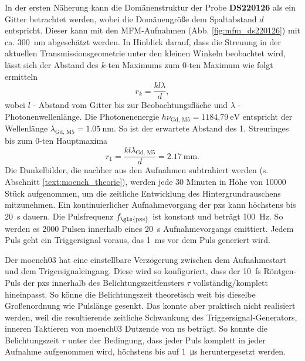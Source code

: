 \noindent
In der ersten Näherung kann die Domänenstruktur der Probe \textbf{DS220126} als ein Gitter betrachtet werden, wobei die Domänengröße dem Spaltabstand $d$ entspricht. Dieser kann mit den MFM-Aufnahmen (Abb. \ref{fig:mfm_ds220126}) mit ca. \SI{300}{\nano\meter} abgeschätzt werden. In Hinblick darauf, dass die Streuung in der aktuellen Transmissionsgeometrie unter den kleinen Winkeln beobachtet wird, lässt sich der Abstand des $k$-ten Maximums zum $0$-ten Maximum wie folgt ermitteln
\begin{equation}
     r_{k} = \frac{kl\lambda}{d},
 \end{equation}
 wobei $l$ - Abstand vom Gitter bis zur Beobachtungsfläche und $\lambda$ - Photonenwellenlänge. Die Photonenenergie $h\nu_{\text{Gd, M5}} = \SI{1184,79}{\eV}$ entspricht der Wellenlänge $\lambda_{\text{Gd, M5}} = \SI{1,05}{\nano\meter}$. So ist der erwartete Abstand des 1. Streuringes bis zum $0$-ten Hauptmaxima 
 \begin{equation}
     r_{1} = \frac{kl\lambda_{\text{Gd, M5}}}{d} = \SI{2.17}{\milli\meter}.
\end{equation}
\noindent
Die Dunkelbilder, die nachher aus den Aufnahmen subtrahiert werden (s. Abschnitt \ref{text:moench_theorie}), werden jede 30 Minuten in Höhe von \num{10000} Stück aufgenommen, um die zeitliche Entwicklung des Hintergrundrauschens mitzunehmen. Ein kontinuierlicher Aufnahmevorgang der \gls{pxs} kann höchstens bis \SI{20}{\second} dauern. Die Pulsfrequenz $f_\text{\gls{pxs}}$ ist konstant und beträgt \SI{100}{\hertz}. So werden es \num{2000} Pulsen innerhalb eines \SI{20}{\second} Aufnahmevorgangs emittiert. Jedem Puls geht ein Triggersignal voraus, das \SI{1}{\milli\second} vor dem Puls generiert wird.

\noindent
Der \gls{moench03} hat eine einstellbare Verzögerung zwischen dem Aufnahmestart und dem Trigersignaleingang. Diese wird so konfiguriert, dass der \SI{10}{\femto\second} Röntgen-Puls der \gls{pxs} innerhalb des Belichtungszeitfensters $\tau$ vollständig/komplett hineinpasst. So könne die Belichtungszeit theoretisch weit bis dieselbe Großenordnung wie Pulslänge gesenkt. Das konnte aber praktisch nicht realisiert werden, weil die resultierende zeitliche Schwankung des Triggersignal-Generators, inneren Taktieren von \gls{moench03} Dutzende von \si{\nano\second} beträgt. So konnte die Belichtungszeit $\tau$ unter der Bedingung, dass jeder Puls komplett in jeder Aufnahme aufgenommen wird, höchstens bis auf \SI{1}{\micro\second} heruntergesetzt werden.

